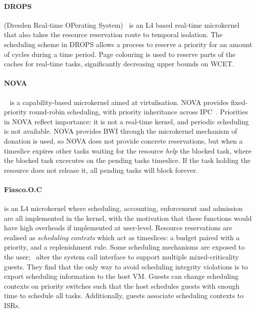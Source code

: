 \paragraph{DROPS} (Dresden Real-time OPerating System)~\citep{Haertig_BBHHMRSW_98} is an L4 based real-time microkernel that also takes the resource reservation route to temporal isolation.
The scheduling scheme in DROPS allows a process to reserve a priority for an amount of cycles during a time period.
Page colouring is used to reserve parts of the caches for real-time tasks, significantly decreasing upper bounds on \gls{WCET}.

\paragraph{NOVA}~\citep{Steinburg_Kauer_10} is a capability-based microkernel aimed at virtulisation. 
NOVA provides fixed-priority round-robin scheduling, with priority inheritance across IPC~\citep{Steinburg_BK_2010}.
Priorities in NOVA reflect importance: it is not a real-time kernel, and periodic scheduling is not available.  
NOVA provides \gls{BWI} through the microkernel mechanism of donation is used, so NOVA does not provide concrete reservations, but when a timeslice expires other tasks waiting for the resource \emph{help} the blocked task, where the blocked task excecutes on the pending tasks timeslice.
If the task holding the resource does not release it, all pending tasks will block forever.


\paragraph{Fiasco.O.C} is an L4 microkernel where scheduling, accounting, enforcement and admission are all implemented in the kernel, with the motivation that these functions would have high overheads if implemented at user-level. 
Resource reservations are realised as \emph{scheduling contexts} which act as timeslices: a budget paired with a priority, and a replenishment rule. 
Some scheduling mechanisms are exposed to the user;~\citet{Lackorzynski_WVH_12} alter the system call interface to support multiple mixed-criticality guests.
They find that the only way to avoid scheduling integrity violations is to export scheduling information to the host \gls{VM}.
Guests can change scheduling contexts on priority switches such that the host schedules guests with enough time to schedule all tasks.
Additionally, guests associate scheduling contexts to \glspl{ISR}.

